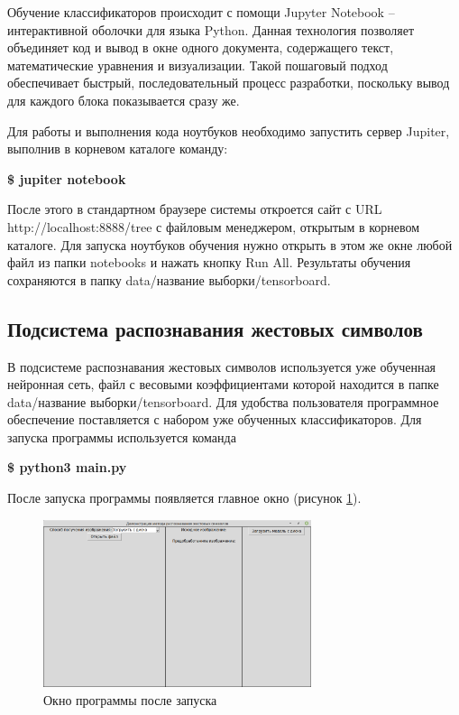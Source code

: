 Обучение классификаторов происходит с помощи Jupyter Notebook -- интерактивной оболочки для языка Python. Данная технология позволяет объединяет код и вывод в окне одного документа, содержащего текст, математические уравнения и визуализации. Такой пошаговый подход обеспечивает быстрый, последовательный процесс разработки, поскольку вывод для каждого блока показывается сразу же.

Для работы и выполнения кода ноутбуков необходимо запустить сервер Jupiter, выполнив в корневом каталоге команду:

\textbf{\$ jupiter notebook}

После этого в стандартном браузере системы откроется сайт с URL http://localhost:8888/tree с файловым менеджером, открытым в корневом каталоге. Для запуска ноутбуков обучения нужно открыть в этом же окне любой файл из папки notebooks и нажать кнопку Run All. Результаты обучения сохраняются в папку data/название выборки/tensorboard.

\subsection*{Подсистема распознавания жестовых символов}

В подсистеме распознавания жестовых символов используется уже обученная нейронная сеть, файл с весовыми коэффициентами которой находится в папке data/название выборки/tensorboard. Для удобства пользователя программное обеспечение поставляется с набором уже обученных классификаторов. Для запуска программы используется команда 

\textbf{\$ python3 main.py}

После запуска программы появляется главное окно (рисунок \ref{impl:main_start}).

\begin{figure}[!h]
	\centering
	\includegraphics[width=0.7\textwidth]{inc/img/main_start}
	\caption{Окно программы после запуска}
	\label{impl:main_start}
\end{figure}

